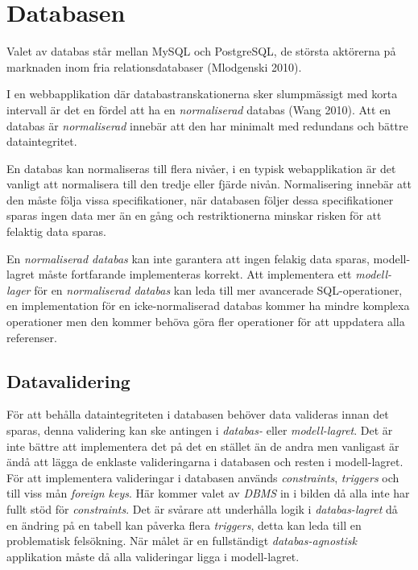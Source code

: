 \section{Databasen}\label{sec:databasen}

Valet av databas står mellan MySQL och PostgreSQL, de största aktörerna på marknaden inom fria relationsdatabaser (Mlodgenski 2010).

I en webbapplikation där databastranskationerna sker slumpmässigt 
med korta intervall är det en fördel att ha en \emph{normaliserad} databas (Wang 2010). 
Att en databas är \emph{normaliserad} innebär att den har minimalt med redundans och bättre dataintegritet.

En databas kan normaliseras till flera nivåer, i en typisk webapplikation är det vanligt att
normalisera till den tredje eller fjärde nivån. 
Normalisering innebär att den måste följa vissa specifikationer, 
när databasen följer dessa specifikationer sparas ingen data mer än en gång 
och restriktionerna minskar risken för att  felaktig data sparas.

En \emph{normaliserad databas} kan inte garantera att ingen felakig data sparas, modell-lagret måste fortfarande implementeras korrekt. Att implementera ett \emph{modell-lager} för en \emph{normaliserad databas} kan leda till mer avancerade SQL-operationer, en implementation för en icke-normaliserad databas kommer ha mindre komplexa operationer men den kommer behöva göra fler operationer för att uppdatera alla referenser.

\subsection{Datavalidering}
För att behålla dataintegriteten i databasen behöver data valideras innan det sparas, denna validering kan ske antingen i \emph{databas-} eller \emph{modell-lagret}.
Det är inte bättre att implementera det på det en stället än de andra men vanligast är ändå att lägga de enklaste valideringarna i databasen och resten i modell-lagret. För att implementera valideringar i databasen används \emph{constraints}, \emph{triggers} och till viss mån \emph{foreign keys}. Här kommer valet av \emph{DBMS} in i bilden då alla inte har fullt stöd för \emph{constraints}.
Det är svårare att underhålla logik i \emph{databas-lagret} då en ändring på en tabell kan påverka flera \emph{triggers}, detta kan leda till en problematisk felsökning.
När målet är en fullständigt \emph{databas-agnostisk} applikation måste då alla valideringar ligga i modell-lagret. 

